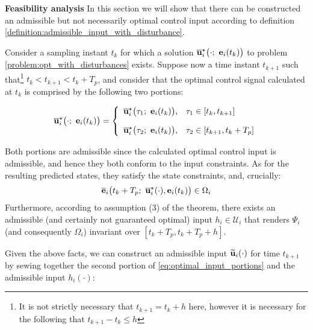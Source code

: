 
\textbf{Feasibility analysis}
In this section we will show that there can be constructed an admissible
but not necessarily optimal control input according to definition
\eqref{definition:admissible_input_with_disturbance}.

Consider a sampling instant $t_k$ for which a
solution $\overline{\vect{u}}_i^{\star}\big(\cdot;\ \vect{e}_i(t_k)\big)$ to
problem \eqref{problem:opt_with_disturbances} exists.
Suppose now a time instant $t_{k+1}$ such that\footnote{It is not strictly necessary
that $t_{k+1} = t_k + h$ here, however it is necessary for the following that
$t_{k+1} - t_k \leq h$} $t_k < t_{k+1} < t_k + T_p$, and consider that the
optimal control signal calculated at $t_k$ is comprised by the following two
portions:

\begin{equation}
  \overline{\vect{u}}_i^{\star}\big(\cdot;\ \vect{e}_i(t_k)\big) = \left\{
      \begin{array}{ll}
        \overline{\vect{u}}_i^{\star}\big(\tau_1;\ \vect{e}_i(t_k)\big), & \tau_1 \in [t_k, t_{k+1}] \\[2.5ex]
        \overline{\vect{u}}_i^{\star}\big(\tau_2;\ \vect{e}_i(t_k)\big), & \tau_2 \in [t_{k+1}, t_k + T_p]
      \end{array}
      \right.
  \label{eq:optimal_input_portions}
\end{equation}

Both portions are admissible since the calculated optimal control input is
admissible, and hence they both conform to the input constraints.
As for the resulting predicted states, they satisfy the state constraints, and,
crucially:
\begin{align}
  \overline{\vect{e}}_i\big(t_k + T_p;\ \overline{\vect{u}}_i^{\star}(\cdot), \vect{e}_i(t_k)\big) \in \Omega_i
  \label{eq:predicted_t_k_T_p_from_t_k_in_omega}
\end{align}
Furthermore, according to assumption (3) of the theorem, there exists an
admissible (and certainly not guaranteed optimal) input
$h_i \in \mathcal{U}_i$ that renders $\Psi_i$
(and consequently $\Omega_i$) invariant over $[t_k + T_p, t_k + T_p + h]$.

Given the above facts, we can construct an admissible input
$\widetilde{\bm{\mathbf{u}}}_i(\cdot)$  for time $t_{k+1}$ by sewing together the second
portion of \eqref{eq:optimal_input_portions} and the admissible input
$h_i(\cdot)$:

